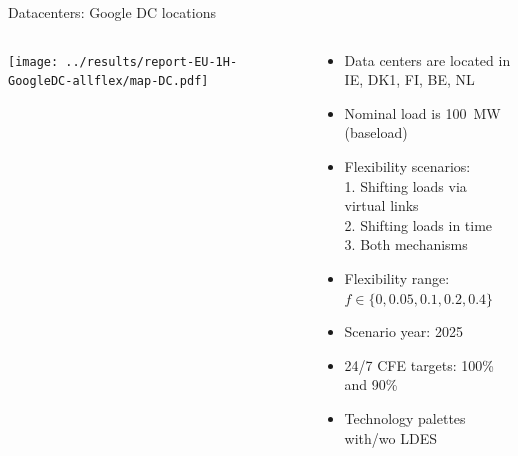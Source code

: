 \begin{frame}{Datacenters: Google DC locations}

  \begin{columns}[T]
  \begin{column}{10cm}

  \centering
  \texttt{[image: ../results/report-EU-1H-GoogleDC-allflex/map-DC.pdf]}


  \end{column}

  \begin{column}{6cm}
  {\small
  \begin{itemize}

  \item Data centers are located in \\ \alert{IE, DK1, FI, BE, NL}
  \item Nominal load is 100~MW (baseload)
  \item Flexibility scenarios: \\
        1. Shifting loads via virtual links \\ 
        2. Shifting loads in time \\ 
        3. Both mechanisms
  \item Flexibility range: $f \in \{0,0.05,0.1,0.2,0.4\}$ 
  \item Scenario year: 2025
  \item 24/7 CFE targets: 100\% and 90\%
  \item Technology palettes with/wo LDES
  
\end{itemize}
  }

  \end{column}
  \end{columns}

\end{frame}



